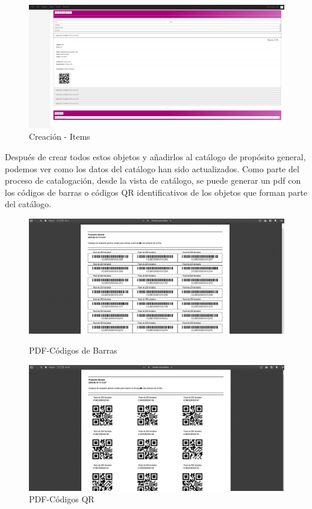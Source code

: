 \documentclass[a4paper,11pt]{book}
\begin{document}
\begin{figure}[H] 
\centering 
\includegraphics[scale=0.25]{imagenes/pruebas/add_catalogo.png}
\caption{ Creación - Items\cite{propio}}
\end{figure}

Después de crear todos estos objetos y añadirlos al catálogo de propósito general, podemos ver como los datos del catálogo han sido actualizados. Como parte del proceso de catalogación, desde la vista de catálogo, se puede generar un pdf con los códigos de barras o códigos QR identificativos de los objetos que forman parte del catálogo.  

\begin{figure}[H]
  \includegraphics[width=\linewidth]{imagenes/pruebas/barras.png}
  \caption{PDF-Códigos de Barras\cite{propio}}
\endminipage\hfill
{}
  \includegraphics[width=\linewidth]{imagenes/pruebas/qr.png}
  \caption{PDF-Códigos QR\cite{propio}}
\endminipage\hfill
\end{figure}
\end{document}
